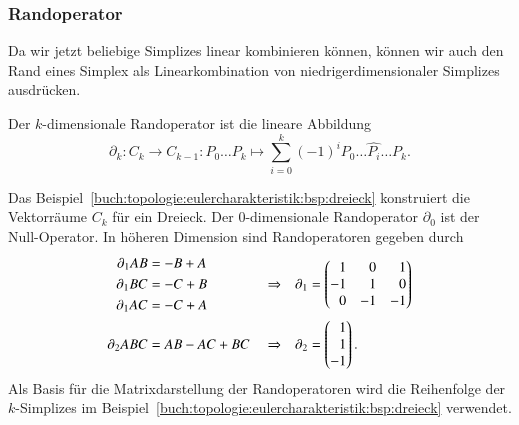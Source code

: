 %
%
\subsubsection{Randoperator}
Da wir jetzt beliebige Simplizes linear kombinieren können, können
wir auch den Rand eines Simplex als Linearkombination von
niedrigerdimensionaler Simplizes ausdrücken.

\begin{definition}[Randoperator]
Der $k$-dimensionale Randoperator ist die lineare Abbildung
\[
\partial_k
\colon
C_k \to C_{k-1}
:
P_0\dots P_k
\mapsto
\sum_{i=0}^k
(-1)^i
P_0\dots\widehat{P_i}\dots P_k.
\]
%
\end{definition}

\begin{beispiel}
\label{buch:topologie:eulercharakteristik:bsp:dreieckrand}
Das Beispiel~\ref{buch:topologie:eulercharakteristik:bsp:dreieck}
konstruiert die Vektorräume $C_k$ für ein Dreieck.
%
Der $0$-dimensionale Randoperator $\partial_0$ ist der Null-Operator.
In höheren Dimension sind Randoperatoren gegeben durch
\begin{align*}
\partial_1 AB &= -B + A &&&&\\
\partial_1 BC &= -C + B &
&\Rightarrow
&\partial_1&=\smash{\begin{pmatrix*}[r]
 1 &  0 &  1 \\
-1 &  1 &  0 \\
 0 & -1 & -1
\end{pmatrix*}}
\\
\partial_1 AC &= -C + A \\
\partial_2 ABC &= AB - AC + BC&&\Rightarrow&\partial_2&=\begin{pmatrix*}[r]1\\1\\-1\end{pmatrix*}.
\end{align*}
Als Basis für die Matrixdarstellung der Randoperatoren wird die
Reihenfolge der $k$-Simplizes im
Beispiel~\ref{buch:topologie:eulercharakteristik:bsp:dreieck}
verwendet.


\end{beispiel}
